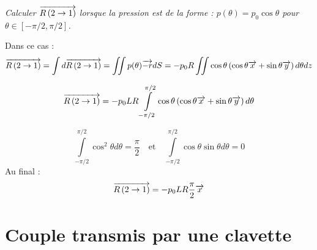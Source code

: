 \documentclass[11pt,oneside]{article}
\begin{document}
\paragraph{}
\textit{Calculer $\overrightarrow{R\left( {2} \rightarrow {1}\right)}$ lorsque la pression est de la forme : $p(\theta)=p_0\cos\theta$ pour $\theta\in[-\pi/2,\pi/2]$.}

Dans ce cas : 
$$
\overrightarrow{R\left( {2} \rightarrow {1}\right)} = \int d\overrightarrow{R\left( {2} \rightarrow {1}\right)} = \iint p(\theta) \overrightarrow{-r} dS 
= - p_0R\iint\cos\theta  \left(\cos\theta\overrightarrow{x}+\sin\theta\overrightarrow{y} \right)  d\theta dz$$

$$
\overrightarrow{R\left( {2} \rightarrow {1}\right)} 
= - p_0 L R\int\limits_{-\pi/2}^{\pi/2}\cos\theta  \left(\cos\theta\overrightarrow{x}+\sin\theta\overrightarrow{y} \right)  d\theta$$

$$
\int\limits_{-\pi/2}^{\pi/2}\cos^2\theta  d\theta = \dfrac{\pi}{2}
\quad 
\text{et}
\quad
\int\limits_{-\pi/2}^{\pi/2}\cos\theta \sin\theta  d\theta = 0
$$
Au final :
$$
\overrightarrow{R\left( {2} \rightarrow {1}\right)} 
= - p_0 L R \dfrac{\pi}{2}\overrightarrow{x}$$



\section*{Couple transmis par une clavette}
\end{document}
